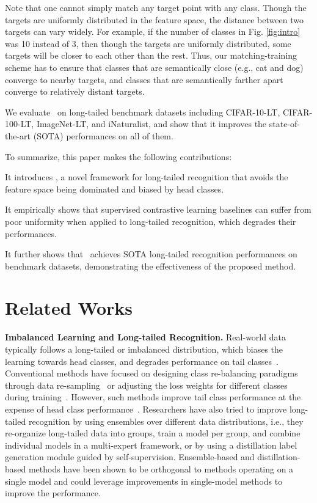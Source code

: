 Note that one cannot simply match any target point with any class. Though the targets are uniformly distributed in the feature space, the distance between two targets can vary widely. For example, if the number of classes in Fig. \ref{fig:intro} was 10 instead of 3, then though the targets are uniformly distributed, some targets will be closer to each other than the rest. Thus, our matching-training scheme has to ensure that classes that are semantically close (e.g., cat and dog)
converge to nearby targets, and classes that are semantically farther apart converge to relatively distant targets. 

We evaluate \name~on long-tailed benchmark datasets including CIFAR-10-LT, CIFAR-100-LT, ImageNet-LT, and iNaturalist, and show that it improves the state-of-the-art (SOTA) performances on all of them.
 
To summarize, this paper makes the following contributions:
\begin{Itemize}
    \item It introduces \name, a novel framework for long-tailed recognition that avoids the feature space being dominated and biased by head classes.
    \item It empirically shows that supervised contrastive learning baselines can suffer from poor uniformity when applied to long-tailed recognition, which degrades their performances.
    \item It further shows that \name~achieves SOTA long-tailed recognition performances on benchmark datasets, demonstrating the effectiveness of the proposed method.
\end{Itemize}

\section{Related Works}

\textbf{Imbalanced Learning and Long-tailed Recognition.}
Real-world data typically follows a long-tailed or imbalanced distribution, which biases the learning towards head classes, and degrades performance on tail classes~\cite{yang2022multi, zhang2021deep}. Conventional methods have focused on designing class re-balancing paradigms through data re-sampling~\cite{chawla2002smote, shen2016relay, buda2018systematic, ando2017deep} or adjusting the loss weights for different classes during training~\cite{cao2019learning, cui2019class, dong2018imbalanced, khan2019striking, khan2017cost, byrd2019effect}. However, such methods improve tail class performance at the expense of head class performance~\cite{kang2019decoupling}.
Researchers have also tried to improve long-tailed recognition by using ensembles over different data distributions\cite{zhou2020bbn, wang2020long,zhang2021test}, i.e., they re-organize long-tailed data into groups, train a model per group, and combine individual models in a multi-expert framework, or by using a distillation label generation module guided by self-supervision\cite{li2021self}. Ensemble-based and distillation-based methods have been shown to be orthogonal to methods operating on a single model and could leverage improvements in single-model methods to improve the performance.

